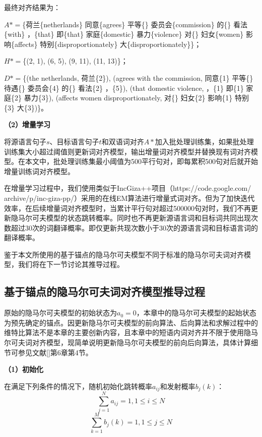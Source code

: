 最终对齐结果为：

$A*=$\{荷兰\{netherlands\} 同意\{agrees\} 平等\{\} 委员会\{commission\} 的\{\} 看法\{with\} ，\{that\} 即\{that\} 家庭\{domestic\} 暴力\{violence\} 对\{\} 妇女\{women\} 影响\{affects\} 特别\{disproportionately\} 大\{disproportionately\}\}；

$H*=$\{(2, 1), (6, 5), (9, 11), (11, 13)\}；

$D*=$\{(the netherlands, 荷兰\{2\}), (agrees with the commission, 同意\{1\} 平等\{\} 待遇\{\}  委员会\{4\} 的\{\} 看法\{2\} ，\{5\}), (that domestic violence, ，\{1\} 即\{1\} 家庭\{2\} 暴力\{3\}), (affects women disproportionately, 对\{\} 妇女\{2\} 影响\{1\} 特别\{3\} 大\{3\})\}。

\textbf{（2）增量学习}

将源语言句子$s$、目标语言句子$t$和双语词对齐$A*$加入批处理训练集，如果批处理训练集大小超过阈值则更新词对齐模型，输出增量词对齐模型并替换现有词对齐模型。在本文中，批处理训练集最小阈值为500平行句对，即每累积500句对后就开始增量训练词对齐模型。

在增量学习过程中，我们使用类似于IncGiza++项目（https://code.google.com/ archive/p/inc-giza-pp/）采用的在线EM算法进行增量式词对齐。但为了加快迭代效率，在后续增量词对齐模型时，当累计平行句对超过500000句对时，我们不再更新隐马尔可夫模型的状态跳转概率。同时也不再更新源语言词和目标词共同出现次数超过30次的词翻译概率。即仅更新共现次数小于30次的源语言词和目标语言词的翻译概率。

鉴于本文所使用的基于锚点的隐马尔可夫模型不同于标准的隐马尔可夫词对齐模型，我们将在下一节讨论其推导过程。

\subsection{基于锚点的隐马尔可夫词对齐模型推导过程}

原始的隐马尔可夫模型的初始状态为$a_0=0$，本章中的隐马尔可夫模型的起始状态为预先确定的锚点。因更新隐马尔可夫模型的前向算法、后向算法和求解过程中的维特比算法不是本章的主要创新内容，且本章中的短语内词对齐并不限于使用隐马尔可夫词对齐模型，现简单说明更新隐马尔可夫模型的前向后向算法，具体计算细节可参见文献[\cite{zong:2013}]第6章第4节。

\textbf{（1）初始化}

在满足下列条件的情况下，随机初始化跳转概率$a_{ij}$和发射概率$b_j(k)$：
\begin{equation}
\sum_{j=1}^{N} a_{ij}=1, 1 \le i \le N
\end{equation}
\begin{equation}
\sum_{k=1}^{M} b_j(k)=1, 1 \le j \le N
\end{equation}


